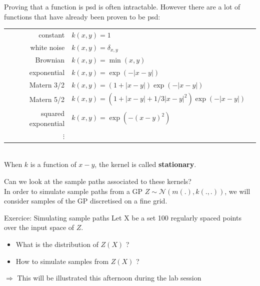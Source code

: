 \documentclass{beamer}
\begin{document}
\begin{frame}{}
Proving that a function is psd is often intractable. However there are a lot of functions that have already been proven to be psd:\\
\vspace{2mm}
\footnotesize
\begin{tabular}{rlN}
		constant & $ \displaystyle k(x,y) = 1 $ &\\[4mm]
		white noise & $ \displaystyle k(x,y) = \delta_{x,y} $ &\\[4mm]
		Brownian & $ \displaystyle k(x,y) =  \min (x,y) $ &\\[4mm]
		exponential & $\displaystyle k(x,y) = \exp \left(- |x-y| \right)$ &\\[4mm]
		Matern 3/2 & $\displaystyle k(x,y) = \left(1 + |x-y| \right) \exp \left(- |x-y| \right)$ &\\[4mm]
		Matern 5/2 & $\displaystyle k(x,y) = \left(1 + |x-y| + 1/3|x-y|^2 \right) \exp \left(- |x-y| \right)$ &\\[4mm]
		squared exponential & $\displaystyle k(x,y) = \exp \left(- (x-y)^2 \right)$ &\\[4mm]
		$\vdots$ & 
\end{tabular}\\
\vspace{2mm}
\normalsize
When $k$ is a function of $x-y$, the kernel is called \textbf{stationary}.
\end{frame}

\begin{frame}{}
Can we look at the sample paths associated to these kernels?\\
\vspace{5mm}
In order to simulate sample paths from a GP $Z \sim \mathcal{N}(m(.),k(.,.))$, we will consider samples of the GP discretised on a fine grid.
\vspace{5mm}
\begin{exampleblock}{Exercice: Simulating sample paths}
Let X be a set 100 regularly spaced points over the input space of $Z$.
\begin{itemize}
	\item What is the distribution of $Z(X)$ ?
	\item How to simulate samples from $Z(X)$ ?
\end{itemize}
\end{exampleblock}
\vspace{5mm}
$\Rightarrow$ This will be illustrated this afternoon during the lab session
\end{frame}
\end{document}

